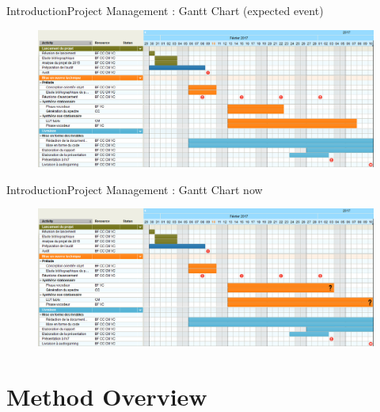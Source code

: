 \documentclass{bredelebeamer}
\begin{document}
\begin{frame}{Introduction}{Project Management : Gantt Chart (expected event)}

\begin{figure}
	\centerline{\includegraphics[scale=0.28]{Gantt.png}}
\end{figure}
\end{frame}

\begin{frame}{Introduction}{Project Management : Gantt Chart now}

\begin{figure}
	\centerline{\includegraphics[scale=0.28]{Gantt2.png}}
\end{figure}
\end{frame}

\section{Method Overview}
\end{document}

